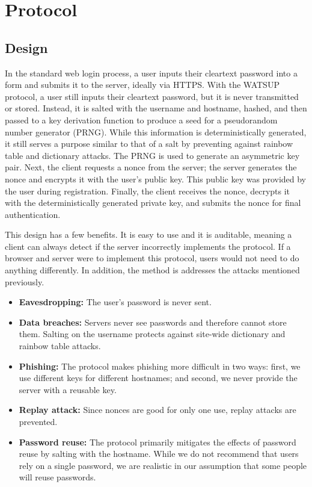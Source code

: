 \section{Protocol}
\label{sec:protocol}

\subsection{Design}

In the standard web login process, a user inputs their cleartext password into a form and submits it to the server, ideally via HTTPS. With the WATSUP protocol, a user still inputs their cleartext password, but it is never transmitted or stored. Instead, it is salted with the username and hostname, hashed, and then passed to a key derivation function to produce a seed for a pseudorandom number generator (PRNG). While this information is deterministically generated, it still serves a purpose similar to that of a salt by preventing against rainbow table and dictionary attacks. The PRNG is used to generate an asymmetric key pair. Next, the client requests a nonce from the server; the server generates the nonce and encrypts it with the user's public key. This public key was provided by the user during registration. Finally, the client receives the nonce, decrypts it with the deterministically generated private key, and submits the nonce for final authentication.

This design has a few benefits. It is easy to use and it is auditable, meaning a client can always detect if the server incorrectly implements the protocol. If a browser and server were to implement this protocol, users would not need to do anything differently. In addition, the method is addresses the attacks mentioned previously.

\begin{itemize}

    \item \textbf{Eavesdropping:} The user's password is never sent.

    \item \textbf{Data breaches:} Servers never see passwords and therefore cannot store them. Salting on the username protects against site-wide dictionary and rainbow table attacks.

    \item \textbf{Phishing:} The protocol makes phishing more difficult in two ways: first, we use different keys for different hostnames; and second, we never provide the server with a reusable key.

    \item \textbf{Replay attack:} Since nonces are good for only one use, replay attacks are prevented.

    \item \textbf{Password reuse:} The protocol primarily mitigates the effects of password reuse by salting with the hostname. While we do not recommend that users rely on a single password, we are realistic in our assumption that some people will reuse passwords.

\end{itemize}

